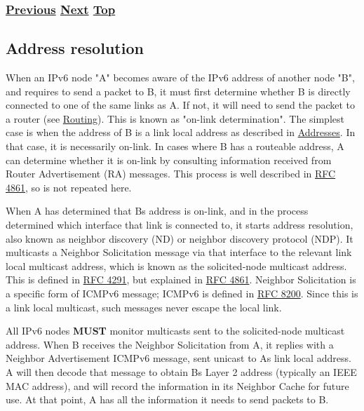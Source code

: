 \documentclass[
]{article}
\begin{document}
\subsubsection{\texorpdfstring{\hyperref[addresses]{Previous}
\hyperref[address-resolution]{Next}
\hyperref[ipv6-basic-technology]{Top}}{Previous Next Top}}\label{previous-next-top-10}

\pagebreak

\subsection{Address resolution}\label{address-resolution}

When an IPv6 node "A" becomes aware of the IPv6 address of another node
"B", and requires to send a packet to B, it must first determine whether
B is directly connected to one of the same links as A. If not, it will
need to send the packet to a router (see \hyperref[routing]{Routing}).
This is known as "on-link determination". The simplest case is when the
address of B is a link local address as described in
\hyperref[addresses]{Addresses}. In that case, it is necessarily
on-link. In cases where B has a routeable address, A can determine
whether it is on-link by consulting information received from Router
Advertisement (RA) messages. This process is well described in
\href{https://www.rfc-editor.org/info/rfc4861}{RFC 4861}, so is not
repeated here.

When A has determined that B\textquotesingle s address is on-link, and
in the process determined which interface that link is connected to, it
starts address resolution, also known as neighbor discovery (ND) or
neighbor discovery protocol (NDP). It multicasts a Neighbor Solicitation
message via that interface to the relevant link local multicast address,
which is known as the solicited-node multicast address. This is defined
in \href{https://www.rfc-editor.org/info/rfc4291}{RFC 4291}, but
explained in \href{https://www.rfc-editor.org/info/rfc4861}{RFC 4861}.
Neighbor Solicitation is a specific form of ICMPv6 message; ICMPv6 is
defined in \href{https://www.rfc-editor.org/info/rfc8200}{RFC 8200}.
Since this is a link local multicast, such messages never escape the
local link.

All IPv6 nodes \textbf{MUST} monitor multicasts sent to the
solicited-node multicast address. When B receives the Neighbor
Solicitation from A, it replies with a Neighbor Advertisement ICMPv6
message, sent unicast to A\textquotesingle s link local address. A will
then decode that message to obtain B\textquotesingle s Layer 2 address
(typically an IEEE MAC address), and will record the information in its
Neighbor Cache for future use. At that point, A has all the information
it needs to send packets to B.
\end{document}

